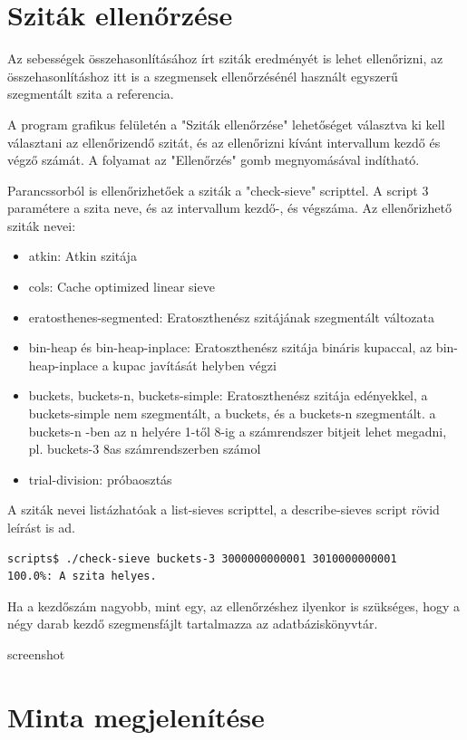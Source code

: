 \documentclass[12pt]{report}
\begin{document}
\section{Sziták ellenőrzése}

Az sebességek összehasonlításához írt sziták eredményét is lehet ellenőrizni,
az összehasonlításhoz itt is a szegmensek ellenőrzésénél használt
egyszerű szegmentált szita a referencia.

A program grafikus felületén a "Sziták ellenőrzése" lehetőséget
választva ki kell választani az ellenőrizendő szitát, és az ellenőrizni
kívánt intervallum kezdő és végző számát.
A folyamat az "Ellenőrzés" gomb megnyomásával indítható.

Parancssorból is ellenőrizhetőek a sziták a "check-sieve" scripttel.
A script 3 paramétere a szita neve, és az intervallum kezdő-, és végszáma.
Az ellenőrizhető sziták nevei:

\begin{itemize}
\item atkin: Atkin szitája
\item cols: Cache optimized linear sieve
\item eratosthenes-segmented: Eratoszthenész szitájának szegmentált változata
\item bin-heap és bin-heap-inplace: Eratoszthenész szitája bináris kupaccal,
	az bin-heap-inplace a kupac javítását helyben végzi
\item buckets, buckets-n, buckets-simple: Eratoszthenész szitája edényekkel,
	a buckets-simple nem szegmentált, a buckets, és a buckets-n szegmentált.
	a buckets-n -ben az n helyére 1-től 8-ig a számrendszer bitjeit lehet megadni,
	pl. buckets-3 8as számrendszerben számol
\item trial-division: próbaosztás
\end{itemize}

A sziták nevei listázhatóak a list-sieves scripttel, a describe-sieves script rövid leírást
is ad.

{\tiny
\begin{lstlisting}[language=bash]
scripts$ ./check-sieve buckets-3 3000000000001 3010000000001
100.0%: A szita helyes.
\end{lstlisting}
}

Ha a kezdőszám nagyobb, mint egy, az ellenőrzéshez ilyenkor is szükséges,
hogy a négy darab kezdő szegmensfájlt tartalmazza az adatbáziskönyvtár.

{\color{red}screenshot}

\section{Minta megjelenítése}
\end{document}
